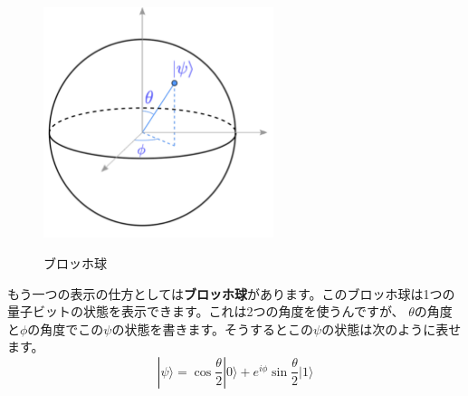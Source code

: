 \begin{figure}[H]
    \centering
    \includegraphics[width=0.6\textwidth]{lesson2/bloch_sphere.pdf}
    \label{fig: 1}
    \begin{center}
        \caption{ブロッホ球}
    \end{center}
\end{figure}
もう一つの表示の仕方としては\textbf{ブロッホ球}があります。このブロッホ球は1つの量子ビットの状態を表示できます。これは2つの角度を使うんですが、
$\theta$の角度と$\phi$の角度でこの$\psi$の状態を書きます。そうするとこの$\psi$の状態は次のように表せます。
\begin{equation}
|\psi\rangle=\cos \frac{\theta}{2}|0\rangle+e^{i \phi} \sin \frac{\theta}{2}|1\rangle
\end{equation}

